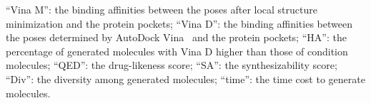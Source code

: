 \begin{table*}
\begin{scriptsize}
\begin{threeparttable}
\begin{tablenotes}
\begin{footnotesize}
{		``Vina M'': the binding affinities between the poses after local structure minimization and the protein pockets;
		``Vina D'': the binding affinities between the poses determined by AutoDock Vina~\cite{Eberhardt2021} and the protein pockets;
		``HA'': the percentage of generated molecules with Vina D higher than those of condition molecules;
		``QED'': the drug-likeness score;
		``SA'': the synthesizability score;
		``Div'': the diversity among generated molecules;
		``time'': the time cost to generate molecules.}
\!\! \par
		\par
		\end{footnotesize}
	\end{tablenotes}
\end{threeparttable}
\end{scriptsize}
  \vspace{-10pt}    
\end{table*}
